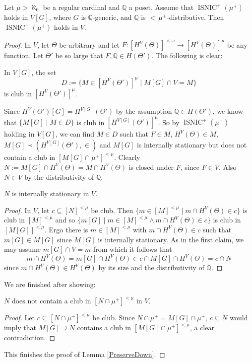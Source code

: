 \documentclass[10pt,a4paper]{amsart}
\DeclareMathOperator{\ISNIC}{ISNIC}
\newcommand{\dQ}{\mathbb{Q}}
\begin{document}
	\begin{mylem}\label{PreserveDown}
		Let $\mu>\aleph_0$ be a regular cardinal and $\dQ$ a poset. Assume that $\ISNIC^+(\mu^+)$ holds in $V[G]$, where $G$ is $\dQ$-generic, and $\dQ$ is ${<}\,\mu^+$-distributive. Then $\ISNIC^+(\mu^+)$ holds in $V$.
	\end{mylem}

	\begin{proof}
		In $V$, let $\Theta$ be arbitrary and let $F\colon[H^V(\Theta)]^{<\omega}\to[H^V(\Theta)]^{\mu}$ be any function. Let $\Theta'$ be so large that $F,\dQ\in H(\Theta')$. The following is clear:
		\setcounter{myclaim}{0}
		\begin{myclaim}
			In $V[G]$, the set
			$$D:=\{M\in[H^V(\Theta')]^{\mu}\;|\;M[G]\cap V=M\}$$
			is club in $[H^V(\Theta')]^{\mu}$.
		\end{myclaim}
		
		Since $H^V(\Theta')[G]=H^{V[G]}(\Theta')$ by the assumption $\dQ\in H(\Theta')$, we know that $\{M[G]\;|\;M\in D\}$ is club in $[H^{V[G]}(\Theta')]^{\mu}$. So by $\ISNIC^+(\mu^+)$ holding in $V[G]$, we can find $M\in D$ such that $F\in M$, $H^V(\Theta)\in M$, $M[G]\prec(H^{V[G]}(\Theta'),\in)$ and $M[G]$ is internally stationary but does not contain a club in $[M[G]\cap\mu^+]^{<\mu}$. Clearly $N:=M[G]\cap H^V(\Theta)=M\cap H^V(\Theta)$ is closed under $F$, since $F\in V$. Also $N\in V$ by the distributivity of $\dQ$.
		
		\begin{myclaim}
			$N$ is internally stationary in $V$.
		\end{myclaim}
		
		\begin{proof}
			In $V$, let $c\subseteq[N]^{<\mu}$ be club. Then $\{m\in[M]^{<\mu}\;|\;m\cap H^V(\Theta)\in c\}$ is club in $[M]^{<\mu}$ and so $\{m[G]\;|\;m\in[M]^{<\mu}\wedge m\cap H^V(\Theta)\in c\}$ is club in $[M[G]]^{<\mu}$. Ergo there is $m\in[M]^{<\mu}$ with $m\cap H^V(\Theta)\in c$ such that $m[G]\in M[G]$ since $M[G]$ is internally stationary. As in the first claim, we may assume $m[G]\cap V=m$ from which it follows that
			$$m\cap H^V(\Theta)=m[G]\cap H^V(\Theta)\in c\cap M[G]\cap H^V(\Theta)=c\cap N$$
			since $m\cap H^V(\Theta)\in H^V(\Theta)$ by its size and the distributivity of $\dQ$.
		\end{proof}
		
		We are finished after showing:
		
		\begin{myclaim}
			$N$ does not contain a club in $[N\cap\mu^+]^{<\mu}$ in $V$.
		\end{myclaim}
		
		\begin{proof}
			Let $c\subseteq[N\cap\mu^+]^{<\mu}$ be club. Since $N\cap\mu^+=M[G]\cap\mu^+$, $c\subseteq N$ would imply that $M[G]\supseteq N$ contains a club in $[M[G]\cap\mu^+]^{<\mu}$, a clear contradiction.
		\end{proof}
		
		This finishes the proof of Lemma \ref{PreserveDown}.
	\end{proof}
\end{document}
